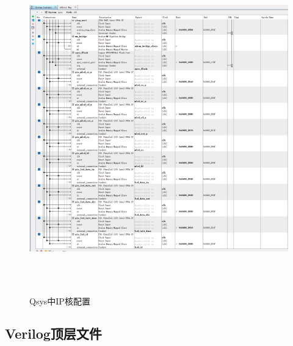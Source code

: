 \documentclass[12pt,hyperref,a4paper,UTF8]{ctexart}
\begin{document}
\begin{figure}[H] %
        \centering
        \includegraphics[width=1\textwidth]{figures/004.png} %
        \caption{Qsys中IP核配置} %
        \label{fig:example} %
\end{figure}

\subsection{Verilog顶层文件}
\end{document}
